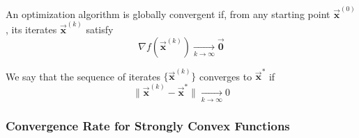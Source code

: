 \documentclass[9pt, headings=standardclasses, parskip=half]{scrartcl}
\renewcommand{\emph}[1]{\textcolor{mypurple}{#1}}
\newcommand{\vect}[1]{\vec{\boldsymbol{#1}}}
\begin{document}
\begin{definition}
An optimization algorithm is globally convergent if, from any starting point \(\vect{x}^{(0)}\), its iterates \(\vect{x}^{(k)}\) satisfy
\[
\nabla f\left(\vect{x}^{(k)}\right) \xrightarrow[k \rightarrow \infty]{} \vect{0}
\]
\end{definition}

\begin{definition}
We say that the sequence of iterates \(\{\vect{x}^{(k)}\}\) converges to \(\vect{x}^{*}\) if
\[
\|\vect{x}^{(k)}-\vect{x}^{*}\| \xrightarrow[k \rightarrow \infty]{} 0
\]
\end{definition}

\subsubsection{Convergence Rate for Strongly Convex Functions}
\label{subsec:gd_strongly_convex}
\end{document}
